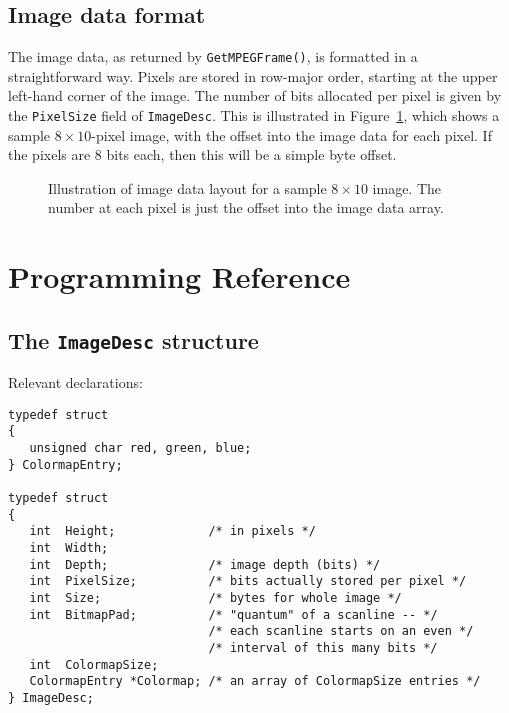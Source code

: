 \documentclass[11pt]{article}
\newcommand{\code}[1]{\texttt{#1}}
\begin{document}

\subsection{Image data format}
\label{sec:image_data}

The image data, as returned by \code{GetMPEGFrame()}, is formatted in
a straightforward way.  Pixels are stored in row-major order, starting
at the upper left-hand corner of the image.  The number of bits
allocated per pixel is given by the \code{PixelSize} field of
\code{ImageDesc}.  This is illustrated in
Figure~\ref{fig:image_format}, which shows a sample $8 \times
10$-pixel image, with the offset into the image data for each pixel.
If the pixels are 8 bits each, then this will be a simple byte offset.

\begin{figure}[htbp]
  \centerline{}
  \caption{Illustration of image data layout for a sample $8 \times 10$
    image.  The number at each pixel is just the offset into the image
    data array.}
  \label{fig:image_format}
\end{figure}


\section{Programming Reference}

\subsection{The \code{ImageDesc} structure}
Relevant declarations:
\begin{verbatim}
typedef struct
{
   unsigned char red, green, blue;
} ColormapEntry;

typedef struct
{
   int  Height;             /* in pixels */
   int  Width;              
   int  Depth;              /* image depth (bits) */
   int  PixelSize;          /* bits actually stored per pixel */
   int  Size;               /* bytes for whole image */
   int  BitmapPad;          /* "quantum" of a scanline -- */
                            /* each scanline starts on an even */
                            /* interval of this many bits */
   int  ColormapSize;     
   ColormapEntry *Colormap; /* an array of ColormapSize entries */
} ImageDesc;
\end{verbatim}
\end{document}
